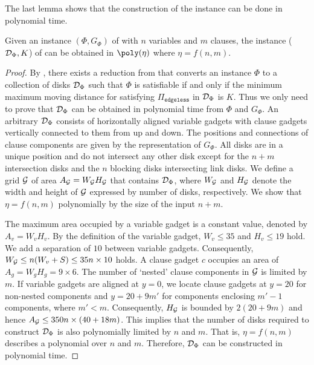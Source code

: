 \begin{toappendix}
\begin{toappendix}
The last lemma shows that the construction of the instance can be done in polynomial time.

\begin{mlemmarep}\label{lem:reduction_poly_time}
    Given an instance $(\Phi,G_{\Phi})$ of {\pthreesat} with $n$ variables and $m$ clauses, the instance ($\mathcal{D}_\Phi,K$) of {\ggedmm} can be obtained in $\poly(\eta)$ where $\eta = f(n,m)$.
\end{mlemmarep}

\begin{proof}
    By , there exists a reduction from {\pthreesat} that converts an instance $\Phi$ to a collection of disks $\mathcal{D}_\Phi$ such that $\Phi$ is satisfiable if and only if the minimum maximum moving distance for satisfying $\Pi_{\texttt{edgeless}}$ in $\mathcal{D}_\Phi$ is $K$.
    Thus we only need to prove that $\mathcal{D}_\Phi$ can be obtained in polynomial time from $\Phi$ and $G_{\Phi}$.
    An arbitrary $\mathcal{D}_\Phi$ consists of horizontally aligned variable gadgets with clause gadgets vertically connected to them from up and down.
    The positions and connections of clause components are given by the representation of $G_{\Phi}$.
    All disks are in a unique position and do not intersect any other disk except for the $n + m$ intersection disks and the $n$ blocking disks intersecting link disks.
    We define a grid $\mathcal{G}$ of area $A_{\mathcal{G}} = W_{\mathcal{G}}H_{\mathcal{G}}$ that contains $\mathcal{D}_\Phi$, where $W_{\mathcal{G}}$ and $H_{\mathcal{G}}$ denote the width and height of $\mathcal{G}$ expressed by number of disks, respectively. We show that $\eta = f(n,m)$ polynomially by the size of the input $n+m$.
    
    The maximum area occupied by a variable gadget is a constant value, denoted by $A_v = W_vH_v$.
    By the definition of the variable gadget, $W_v \le 35$ and $H_v \le 19$ hold.
    We add a separation of $10$ between variable gadgets. Consequently, $W_{\mathcal{G}} \le n(W_v+S)\le 35n\times 10$ holds. %
    A clause gadget $c$ occupies an area of $A_g = W_gH_g = 9\times 6$. %
    The number of `nested' clause components in $\mathcal{G}$ is limited by $m$.
    If variable gadgets are aligned at $y = 0$, we locate clause gadgets at $y=20$ for non-nested components and $y = 20+9m'$ for components enclosing $m'-1$ components, where $m' < m$.
    Consequently, $H_{\mathcal{G}}$ is bounded by $2(20+9m)$ and hence $A_{\mathcal{G}} \le 350n \times (40+18m)$.
    This implies that the number of disks required to construct $\mathcal{D}_\Phi$ is also polynomially limited by $n$ and $m$.
    That is, $\eta = f(n,m)$ describes a polynomial over $n$ and $m$.
    Therefore, $\mathcal{D}_\Phi$ can be constructed in polynomial time.
\end{proof}


\end{toappendix}
\end{toappendix}
